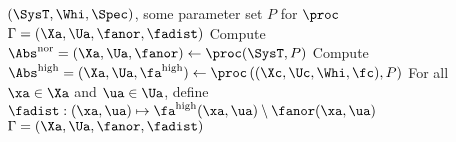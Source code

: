 \begin{algorithm}
	\caption{$\procRisk$}
	\label{alg:compute risk-aware abstraction}
	\begin{algorithmic}[1]
		\INPUT $(\SysT,\Whi,\Spec)$, some parameter set $P$ for $\proc$
		\OUTPUT $\Gamma=(\Xa,\Ua,\fanor,\fadist)$ 
		\State Compute $\Abs^{\mathrm{nor}}=(\Xa,\Ua,\fanor)\gets\proc(\SysT,P)$
		\State Compute $\Abs^{\mathrm{high}}=(\Xa,\Ua,\fa^{\mathrm{high}})\gets\proc\left((\Xc,\Uc,\Whi,\fc),P\right)$
		\State For all $\xa\in \Xa$ and $\ua\in \Ua$, define $\fadist:(\xa,\ua)\mapsto \fa^{\mathrm{high}}(\xa,\ua)\setminus \fanor(\xa,\ua)$
		\State \Return $\Gamma=(\Xa,\Ua,\fanor,\fadist)$
	\end{algorithmic}
\end{algorithm}

% 

